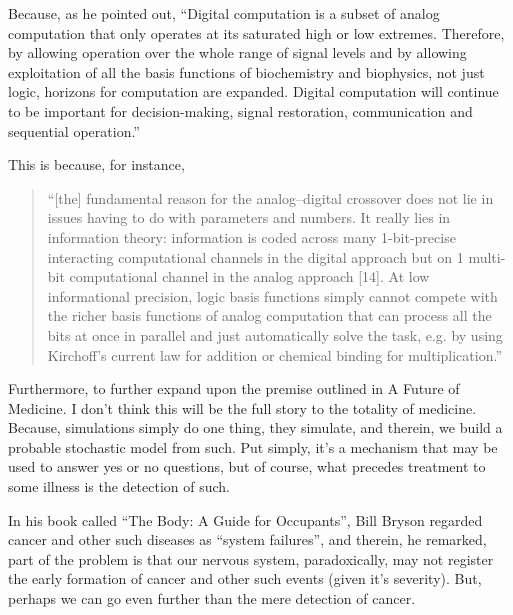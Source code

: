 Because, as he pointed out, ``Digital computation is a subset of analog computation that only operates at its saturated high or low extremes. Therefore, by allowing operation over the whole range of signal levels and by allowing exploitation of all the basis functions of biochemistry and biophysics, not just logic, horizons for computation are expanded. Digital computation will continue to be important for decision-making, signal restoration, communication and sequential operation.''

This is because, for instance, \begin{quotation}
    ``[the] fundamental reason for the analog–digital crossover does not lie in issues having to do with parameters and numbers. It really lies in information theory: information is coded across many 1-bit-precise interacting computational channels in the digital approach but on 1 multi-bit computational channel in the analog approach [14]. At low informational precision, logic basis functions simply cannot compete with the richer basis functions of analog computation that can process all the bits at once in parallel and just automatically solve the task, e.g. by using Kirchoff’s current law for addition or chemical binding for multiplication.''
\end{quotation}

Furthermore, to further expand upon the premise outlined in A Future of Medicine. I don't think this will be the full story to the totality of medicine. Because, simulations simply do one thing, they simulate, and therein, we build a probable stochastic model from such. Put simply, it's a mechanism that may be used to answer yes or no questions, but of course, what precedes treatment to some illness is the detection of such. 

In his book called ``The Body: A Guide for Occupants'', Bill Bryson regarded cancer and other such diseases as ``system failures'', and therein, he remarked, part of the problem is that our nervous system, paradoxically, may not register the early formation of cancer and other such events (given it's severity). But, perhaps we can go even further than the mere detection of cancer.

